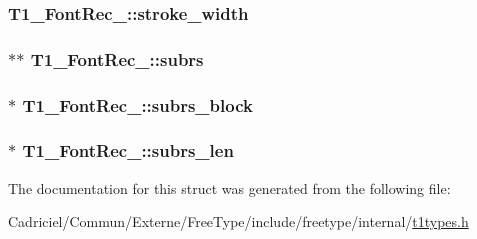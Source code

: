 \hypertarget{struct_t1___font_rec___ac71ace1872be6b2adbd3d6f5ca456d23}{
\subsubsection[{stroke\-\_\-width}]{ T1\-\_\-\-Font\-Rec\-\_\-\-::stroke\-\_\-width}}\label{struct_t1___font_rec___ac71ace1872be6b2adbd3d6f5ca456d23}
\hypertarget{struct_t1___font_rec___a46fcdb34f96efc9ee53b21d219780694}{
\subsubsection[{subrs}]{$\ast$$\ast$ T1\-\_\-\-Font\-Rec\-\_\-\-::subrs}}\label{struct_t1___font_rec___a46fcdb34f96efc9ee53b21d219780694}
\hypertarget{struct_t1___font_rec___a46675e2cba990def15e0ea01b11578a7}{
\subsubsection[{subrs\-\_\-block}]{$\ast$ T1\-\_\-\-Font\-Rec\-\_\-\-::subrs\-\_\-block}}\label{struct_t1___font_rec___a46675e2cba990def15e0ea01b11578a7}
\hypertarget{struct_t1___font_rec___aa24ce3583a6ada78cde3770d95b9bb9a}{
\subsubsection[{subrs\-\_\-len}]{$\ast$ T1\-\_\-\-Font\-Rec\-\_\-\-::subrs\-\_\-len}}\label{struct_t1___font_rec___aa24ce3583a6ada78cde3770d95b9bb9a}


The documentation for this struct was generated from the following file\-:\begin{DoxyCompactItemize}
\item 
Cadriciel/\-Commun/\-Externe/\-Free\-Type/include/freetype/internal/\hyperlink{t1types_8h}{t1types.\-h}\end{DoxyCompactItemize}
